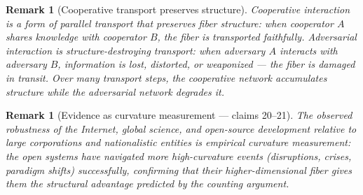 \documentclass[11pt,a4paper]{article}
\newtheorem{remark}[definition]{Remark}
\begin{document}
\begin{remark}[Cooperative transport preserves structure]
Cooperative interaction is a form of parallel transport that preserves
fiber structure: when cooperator $A$ shares knowledge with cooperator $B$,
the fiber is transported faithfully. Adversarial interaction is
structure-destroying transport: when adversary $A$ interacts with
adversary $B$, information is lost, distorted, or weaponized --- the
fiber is damaged in transit. Over many transport steps, the cooperative
network accumulates structure while the adversarial network degrades it.
\end{remark}

\begin{remark}[Evidence as curvature measurement --- claims 20--21]
The observed robustness of the Internet, global science, and open-source
development relative to large corporations and nationalistic entities
is empirical curvature measurement: the open systems have navigated
more high-curvature events (disruptions, crises, paradigm shifts)
successfully, confirming that their higher-dimensional fiber gives
them the structural advantage predicted by the counting argument.
\end{remark}
\end{document}
